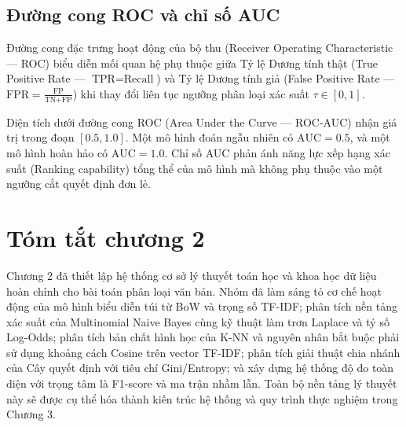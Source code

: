 \subsection{Đường cong ROC và chỉ số AUC}
Đường cong đặc trưng hoạt động của bộ thu (Receiver Operating Characteristic --- ROC) biểu diễn mối quan hệ phụ thuộc giữa Tỷ lệ Dương tính thật (True Positive Rate --- $\text{TPR} = \text{Recall}$) và Tỷ lệ Dương tính giả (False Positive Rate --- $\text{FPR} = \frac{\text{FP}}{\text{TN} + \text{FP}}$) khi thay đổi liên tục ngưỡng phân loại xác suất $\tau \in [0, 1]$.

Diện tích dưới đường cong ROC (Area Under the Curve --- ROC-AUC) nhận giá trị trong đoạn $[0.5, 1.0]$. Một mô hình đoán ngẫu nhiên có $\text{AUC} = 0.5$, và một mô hình hoàn hảo có $\text{AUC} = 1.0$. Chỉ số AUC phản ánh năng lực xếp hạng xác suất (Ranking capability) tổng thể của mô hình mà không phụ thuộc vào một ngưỡng cắt quyết định đơn lẻ.

\section{Tóm tắt chương 2}
Chương 2 đã thiết lập hệ thống cơ sở lý thuyết toán học và khoa học dữ liệu hoàn chỉnh cho bài toán phân loại văn bản. Nhóm đã làm sáng tỏ cơ chế hoạt động của mô hình biểu diễn túi từ BoW và trọng số TF-IDF; phân tích nền tảng xác suất của Multinomial Naive Bayes cùng kỹ thuật làm trơn Laplace và tỷ số Log-Odds; phân tích bản chất hình học của K-NN và nguyên nhân bắt buộc phải sử dụng khoảng cách Cosine trên vector TF-IDF; phân tích giải thuật chia nhánh của Cây quyết định với tiêu chí Gini/Entropy; và xây dựng hệ thống độ đo toàn diện với trọng tâm là F1-score và ma trận nhầm lẫn. Toàn bộ nền tảng lý thuyết này sẽ được cụ thể hóa thành kiến trúc hệ thống và quy trình thực nghiệm trong Chương 3.